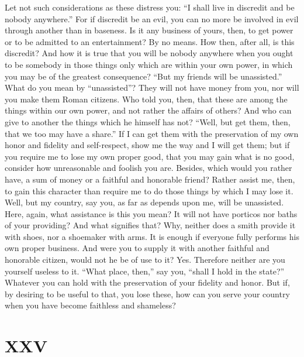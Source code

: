 \documentclass[11pt]{article}
\begin{document}
Let not such considerations as these distress you: “I shall live in discredit and be nobody anywhere.” For if discredit be an evil, you can no more be involved in evil through another than in baseness. Is it any business of yours, then, to get power or to be admitted to an entertainment? By no means. How then, after all, is this discredit? And how it is true that you will be nobody anywhere when you ought to be somebody in those things only which are within your own power, in which you may be of the greatest consequence? “But my friends will be unassisted.” What do you mean by “unassisted”? They will not have money from you, nor will you make them Roman citizens. Who told you, then, that these are among the things within our own power, and not rather the affairs of others? And who can give to another the things which he himself has not? “Well, but get them, then, that we too may have a share.” If I can get them with the preservation of my own honor and fidelity and self-respect, show me the way and I will get them; but if you require me to lose my own proper good, that you may gain what is no good, consider how unreasonable and foolish you are. Besides, which would you rather have, a sum of money or a faithful and honorable friend? Rather assist me, then, to gain this character than require me to do those things by which I may lose it. Well, but my country, say you, as far as depends upon me, will be unassisted. Here, again, what assistance is this you mean? It will not have porticos nor baths of your providing? And what signifies that? Why, neither does a smith provide it with shoes, nor a shoemaker with arms. It is enough if everyone fully performs his own proper business. And were you to supply it with another faithful and honorable citizen, would not he be of use to it? Yes. Therefore neither are you yourself useless to it. “What place, then,” say you, “shall I hold in the state?” Whatever you can hold with the preservation of your fidelity and honor. But if, by desiring to be useful to that, you lose these, how can you serve your country when you have become faithless and shameless?
\section*{XXV}
\end{document}
